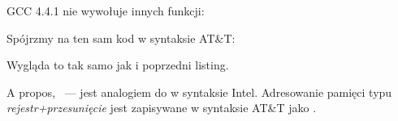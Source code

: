 
GCC 4.4.1 nie wywołuje innych funkcji:




Spójrzmy na ten sam kod w syntaksie AT\&T:



\myindex{\ATTSyntax}
Wygląda to tak samo jak i poprzedni listing.

A propos, ~--- jest analogiem do  w syntaksie Intel.
Adresowanie pamięci typu \emph{rejestr+przesunięcie} jest zapisywane w syntaksie AT\&T jako .


